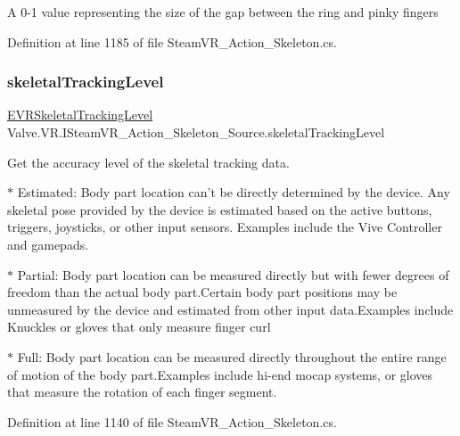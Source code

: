 A 0-\/1 value representing the size of the gap between the ring and pinky fingers 



Definition at line 1185 of file Steam\+V\+R\+\_\+\+Action\+\_\+\+Skeleton.\+cs.

\mbox{\label{interface_valve_1_1_v_r_1_1_i_steam_v_r___action___skeleton___source_ab32334c7fddee9e954e1a23ffae8a171}} 
\subsubsection{\texorpdfstring{skeletalTrackingLevel}{skeletalTrackingLevel}}
{\footnotesize\ttfamily \mbox{\hyperlink{namespace_valve_1_1_v_r_a6f46bd50fb65255d6537ab32a6bddc30}{E\+V\+R\+Skeletal\+Tracking\+Level}} Valve.\+V\+R.\+I\+Steam\+V\+R\+\_\+\+Action\+\_\+\+Skeleton\+\_\+\+Source.\+skeletal\+Tracking\+Level\hspace{0.3cm}{\ttfamily [get]}}



Get the accuracy level of the skeletal tracking data. 

$\ast$ Estimated\+: Body part location can’t be directly determined by the device. Any skeletal pose provided by the device is estimated based on the active buttons, triggers, joysticks, or other input sensors. Examples include the Vive Controller and gamepads. 

$\ast$ Partial\+: Body part location can be measured directly but with fewer degrees of freedom than the actual body part.\+Certain body part positions may be unmeasured by the device and estimated from other input data.\+Examples include Knuckles or gloves that only measure finger curl 

$\ast$ Full\+: Body part location can be measured directly throughout the entire range of motion of the body part.\+Examples include hi-\/end mocap systems, or gloves that measure the rotation of each finger segment. 



Definition at line 1140 of file Steam\+V\+R\+\_\+\+Action\+\_\+\+Skeleton.\+cs.

\mbox{\label{interface_valve_1_1_v_r_1_1_i_steam_v_r___action___skeleton___source_ab0ef346413ba57f7a65bd0a8b138b2fe}} 

